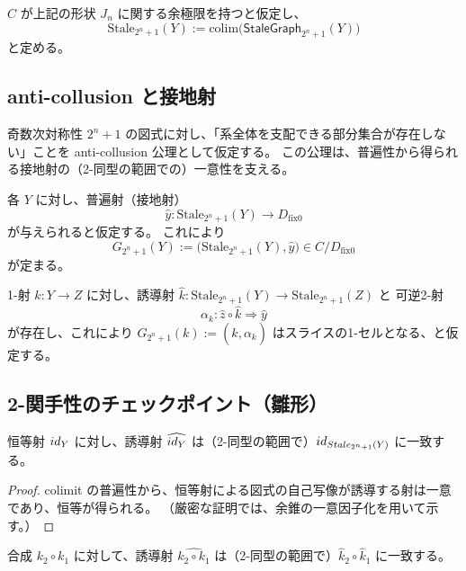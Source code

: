 \documentclass[a4paper,11pt]{article}
\begin{document}
\begin{definition}
$C$ が上記の形状 $J_n$ に関する余極限を持つと仮定し、
\[
  \mathrm{Stale}_{2^n+1}(Y):=\mathrm{colim}\bigl(\mathsf{StaleGraph}_{2^n+1}(Y)\bigr)
\]
と定める。
\end{definition}

\subsection{anti-collusion と接地射}
\begin{definition}
奇数次対称性 $2^n+1$ の図式に対し、「系全体を支配できる部分集合が存在しない」ことを anti-collusion 公理として仮定する。
この公理は、普遍性から得られる接地射の（2-同型の範囲での）一意性を支える。
\end{definition}

\begin{definition}
各 $Y$ に対し、普遍射（接地射）
\[
  \hat y:\mathrm{Stale}_{2^n+1}(Y)\to D_{\mathrm{fix}0}
\]
が与えられると仮定する。
これにより
\[
  G_{2^n+1}(Y):=\bigl(\mathrm{Stale}_{2^n+1}(Y),\hat y\bigr)\in C/D_{\mathrm{fix}0}
\]
が定まる。
\end{definition}

\begin{definition}[$G_{2^n+1}$ の射への作用（仕様）]
1-射 $k:Y\to Z$ に対し、誘導射 $\hat k:\mathrm{Stale}_{2^n+1}(Y)\to \mathrm{Stale}_{2^n+1}(Z)$ と
可逆2-射
\[
  \alpha_k:\hat z\circ \hat k \Rightarrow \hat y
\]
が存在し、これにより $G_{2^n+1}(k):=(\hat k,\alpha_k)$ はスライスの1-セルとなる、と仮定する。
\end{definition}

\subsection{2-関手性のチェックポイント（雛形）}
\begin{lemma}
恒等射 $id_Y$ に対し、誘導射 $\widehat{id_Y}$ は（2-同型の範囲で）$id_{Stale_{2^n+1}(Y)}$ に一致する。
\end{lemma}

\begin{proof}
colimit の普遍性から、恒等射による図式の自己写像が誘導する射は一意であり、恒等が得られる。
（厳密な証明では、余錐の一意因子化を用いて示す。）
\end{proof}

\begin{lemma}
合成 $k_2\circ k_1$ に対して、誘導射 $\widehat{k_2\circ k_1}$ は（2-同型の範囲で）$\hat k_2\circ \hat k_1$ に一致する。
\end{lemma}
\end{document}
